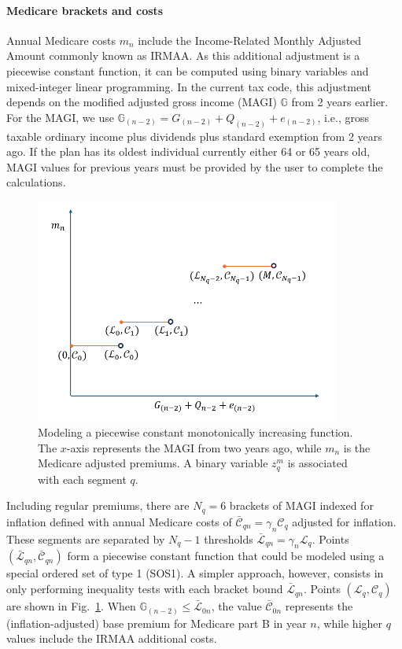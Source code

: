 \documentclass{report}[fleqn,12pt]
\begin{document}
\paragraph*{Medicare brackets and costs}
	Annual Medicare costs $m_n$ include the Income-Related Monthly Adjusted Amount
	commonly known as IRMAA.
	As this additional adjustment
	is a piecewise constant function,
        it can be computed using binary variables and mixed-integer linear
	programming. In the current tax code, this adjustment
	depends on the modified adjusted gross income (MAGI) $\mathbb{G}$ from 2 years earlier. For the
	MAGI, we use $\mathbb{G}_{(n-2)} = G_{(n-2)} + Q_{(n-2)} + e_{(n-2)}$,
	i.e., gross taxable ordinary income plus dividends
	plus standard exemption from 2 years ago.
	If the plan
        has its oldest individual currently either 64 or 65 years old, MAGI values for previous years
	must be provided by the user to complete the calculations.
	\begin{figure}[t]
	    \center\includegraphics[width=10cm]{piecewiseConstant.png}
	    \caption{\small Modeling a piecewise constant monotonically increasing function.
	    The $x$-axis represents the MAGI from two years ago, while $m_n$ is the Medicare adjusted premiums.
	    A binary variable $z_q^m$ is associated with each segment $q$.
	    \label{Fig:piecewise}}
	\end{figure}

	Including regular premiums, there are $N_q=6$ brackets
	of MAGI indexed for inflation defined with annual Medicare costs of
	$\bar{\mathcal{C}}_{qn} = \gamma_n\mathcal{C}_q$ adjusted for inflation.
        These segments are separated by $N_q -1$ thresholds
	$\bar{\mathcal{L}}_{qn} = \gamma_n\mathcal{L}_q$.
        Points $(\bar{\mathcal{L}}_{qn}, \bar{\mathcal{C}}_{qn})$ form a piecewise
	constant function that could be modeled using a special ordered set of type 1 (SOS1).
        A simpler approach, however, consists in only performing inequality tests with
        each bracket bound $\bar{\mathcal{L}}_{qn}$.
	Points $(\mathcal{L}_q, \mathcal{C}_q)$ are shown in Fig.~\ref{Fig:piecewise}.
        When $\mathbb{G}_{(n-2)} \leq \bar{\mathcal{L}}_{0n}$,
	the value $\bar{\mathcal{C}}_{0n}$
	represents the (inflation-adjusted) base premium for Medicare part B in year $n$, while
	higher $q$ values include the IRMAA additional costs.
\end{document}
